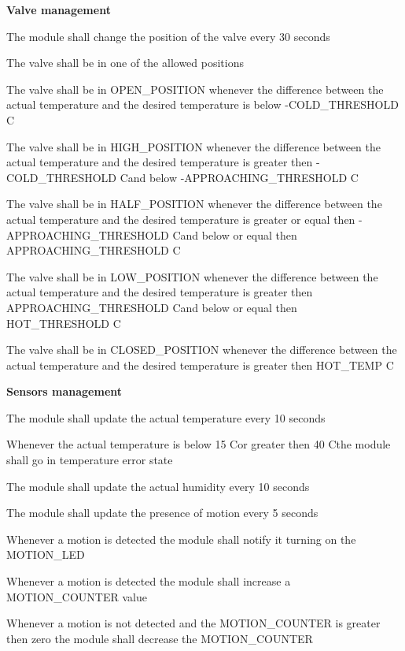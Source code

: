 \begin{req_enum}
	\item \textbf{Valve management}
	\begin{req_enum}[label*=\arabic*.]
		\item The module shall change the position of the valve every 30 seconds
		\item The valve shall be in one of the allowed positions
		\begin{req_enum}[label*=\arabic*.]
			\item The valve shall be in OPEN\_POSITION whenever the difference between the actual temperature and the desired temperature is below -COLD\_THRESHOLD C\degree
			\item The valve shall be in HIGH\_POSITION whenever the difference between the actual temperature and the desired temperature is greater then -COLD\_THRESHOLD C\degree and below -APPROACHING\_THRESHOLD C\degree
			\item The valve shall be in HALF\_POSITION whenever the difference between the actual temperature and the desired temperature is greater or equal then -APPROACHING\_THRESHOLD C\degree and below or equal then APPROACHING\_THRESHOLD C\degree
			\item The valve shall be in LOW\_POSITION whenever the difference between the actual temperature and the desired temperature is greater then APPROACHING\_THRESHOLD C\degree and below or equal then HOT\_THRESHOLD C\degree
			\item The valve shall be in CLOSED\_POSITION whenever the difference between the actual temperature and the desired temperature is greater then HOT\_TEMP C\degree
		\end{req_enum}
	\end{req_enum}

	\item \textbf{Sensors management}
		\begin{req_enum}[label*=\arabic*.]
			\item The module shall update the actual temperature every 10 seconds
			\item Whenever the actual temperature is below 15 C\degree or greater then 40 C\degree the module shall go in temperature error state
			\item The module shall update the actual humidity every 10 seconds
			\item The module shall update the presence of motion every 5 seconds
			\item Whenever a motion is detected the module shall notify it turning on the MOTION\_LED
			\item Whenever a motion is detected the module shall increase a MOTION\_COUNTER value
			\item Whenever a motion is not detected and the MOTION\_COUNTER is greater then zero the module shall decrease the MOTION\_COUNTER
		\end{req_enum}


\end{req_enum}
